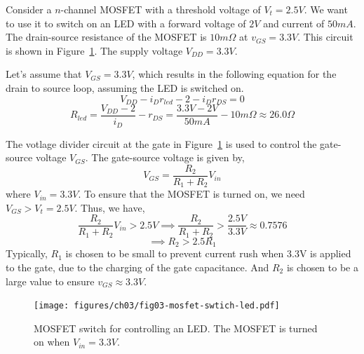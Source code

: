 \begin{boxedstuff}
    \begin{example}
        Consider a $n$-channel MOSFET with a threshold voltage of $V_t = 2.5V$. We want to use it to switch on an LED with a forward voltage of $2V$ and current of $50mA$. The drain-source resistance of the MOSFET is $10m\Omega$ at $v_{GS} = 3.3V$. This circuit is shown in Figure~\ref{fig:03-mosfet-switch-led}. The supply voltage $V_{DD} = 3.3V$.

        Let's assume that $V_{GS} = 3.3V$, which results in the following equation for the drain to source loop, assuming the LED is switched on.
        \[ V_{DD} - i_D r_{led} - 2 - i_D r_{DS} = 0 \]
        \[ R_{led} = \frac{V_{DD} - 2}{i_D} - r_{DS} = \frac{3.3V - 2V}{50mA} - 10m\Omega \approx 26.0\Omega \]

        The votlage divider circuit at the gate in Figure~\ref{fig:03-mosfet-switch-led} is used to control the gate-source voltage $V_{GS}$. The gate-source voltage is given by,
        \[ V_{GS} = \frac{R_2}{R_1 + R_2}V_{in} \]
        where $V_{in} = 3.3V$. To ensure that the MOSFET is turned on, we need $V_{GS} > V_t = 2.5V$. Thus, we have,
        \[ \frac{R_2}{R_1 + R_2}V_{in} > 2.5V \implies \frac{R_2}{R_1 + R_2} > \frac{2.5V}{3.3V} \approx 0.7576 \]
        \[ \implies R_2 > 2.5R_1 \]
        Typically, $R_1$ is chosen to be small to prevent current rush when 3.3V is applied to the gate, due to the charging of the gate capacitance. And $R_2$ is chosen to be a large value to ensure $v_{GS} \approx 3.3V$.
    \end{example}
\end{boxedstuff}
\begin{figure}[htbp]
    \centering
    \texttt{[image: figures/ch03/fig03-mosfet-swtich-led.pdf]}
    \caption{MOSFET switch for controlling an LED. The MOSFET is turned on when $V_{in} = 3.3V$.}
    \label{fig:03-mosfet-switch-led}
\end{figure}

